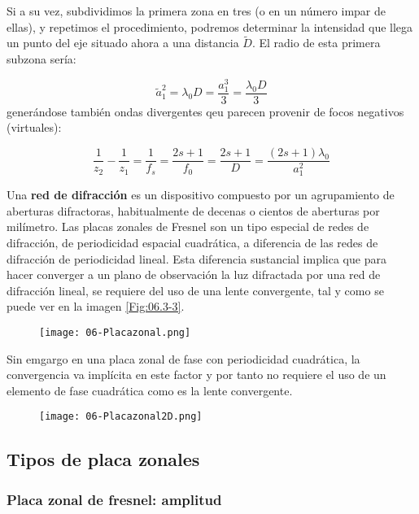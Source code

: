 \documentclass[12pt,a4paper]{book}
\numberwithin{equation}{section}
\numberwithin{figure}{section}
\newcommand{\1}{_{(1)}}
\newcommand{\2}{_{(2)}}
\theoremstyle{definition}
\begin{document}
Si a su vez, subdividimos la primera zona en tres (o en un número impar de ellas), y repetimos el procedimiento, podremos determinar la intensidad que llega un punto del eje situado ahora a una distancia $\tilde{D}$. El radio de esta primera subzona sería:

\begin{equation}
    \tilde{a}_1^2 = \lambda_0 D = \frac{a_1^3}{3} =  \frac{\lambda_0D}{3}
\end{equation}
generándose también ondas divergentes qeu parecen provenir de focos negativos (virtuales): 

\begin{equation}
    \frac{1}{z_2} - \frac{1}{z_1} = \frac{1}{f_s} = \frac{2s+1}{f_0} = \frac{2s+1}{D} = \frac{(2s+1)\lambda_0}{a_1^2}
\end{equation}


Una \textbf{red de difracción} es un dispositivo compuesto por un agrupamiento de aberturas difractoras, habitualmente de decenas o cientos de aberturas por milímetro. Las placas zonales de Fresnel son un tipo especial de redes de difracción, de periodicidad espacial cuadrática, a diferencia de las redes de difracción de periodicidad lineal. Esta diferencia sustancial implica que para hacer converger a un plano de observación la luz difractada por una red de difracción lineal, se requiere del uso de una lente convergente, tal y como se puede ver en la imagen \ref{Fig:06.3-3}.

\begin{figure}[h!]
    \centering
    \texttt{[image: 06-Placazonal.png]}
    \caption{}
    \label{Fig:06.3-03}
\end{figure}

Sin emgargo en una placa zonal de fase con periodicidad cuadrática, la convergencia va implícita en este factor y por tanto no requiere el uso de un elemento de fase cuadrática como es la lente convergente. 

\begin{figure}[h!]
    \centering
    \texttt{[image: 06-Placazonal2D.png]}
    \caption{}
    \label{Fig:06.3-04}
\end{figure}


\subsection{Tipos de placa zonales}

\subsubsection{Placa zonal de fresnel: amplitud}
\end{document}
